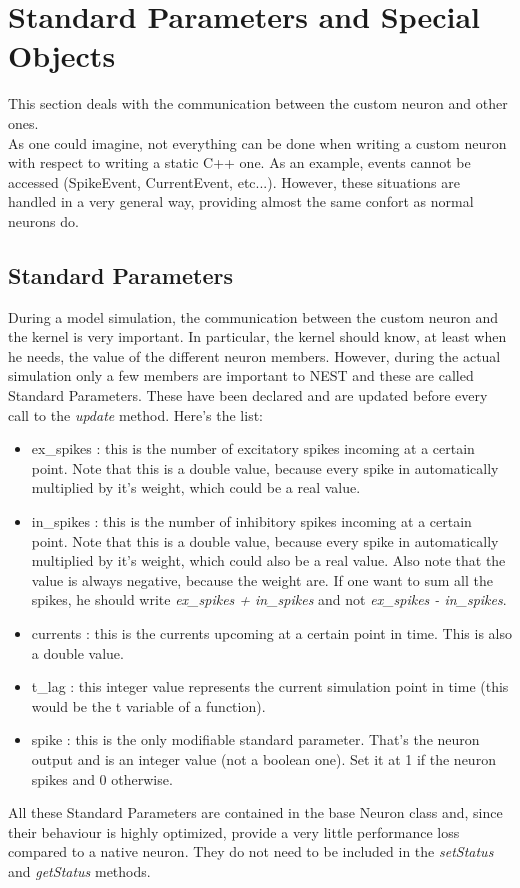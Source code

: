 \documentclass{article}
\begin{document}
\section{Standard Parameters and Special Objects}
This section deals with the communication between the custom neuron and other ones.\\
As one could imagine, not everything can be done when writing a custom neuron with respect to writing a static C++ one. As an example, events cannot be accessed (SpikeEvent, CurrentEvent, etc...). However, these situations are handled in a very general way, providing almost the same confort as normal neurons do.

\subsection{Standard Parameters}
During a model simulation, the communication between the custom neuron and the kernel is very important. In particular, the kernel should know, at least when he needs, the value of the different neuron members. However, during the actual simulation only a few members are important to NEST and these are called Standard Parameters.
These have been declared and are updated before every call to the \emph{update} method. Here's the list:
\begin{itemize}
\item ex\_spikes : this is the number of excitatory spikes incoming at a certain point. Note that this is a double value, because every spike in automatically multiplied by it's weight, which could be a real value.
\item in\_spikes : this is the number of inhibitory spikes incoming at a certain point. Note that this is a double value, because every spike in automatically multiplied by it's weight, which could also be a real value. Also note that the value is always negative, because the weight are. If one want to sum all the spikes, he should write \emph{ex\_spikes + in\_spikes} and not \emph{ex\_spikes - in\_spikes}.
\item currents : this is the currents upcoming at a certain point in time. This is also a double value.
\item t\_lag : this integer value represents the current simulation point in time (this would be the t variable of a function).
\item spike : this is the only modifiable standard parameter. That's the neuron output and is an integer value (not a boolean one). Set it at 1 if the neuron spikes and 0 otherwise.
\end{itemize}
All these Standard Parameters are contained in the base Neuron class and, since their behaviour is highly optimized, provide a very little performance loss compared to a native neuron. They do not need to be included in the \emph{setStatus} and \emph{getStatus} methods.
\end{document}
